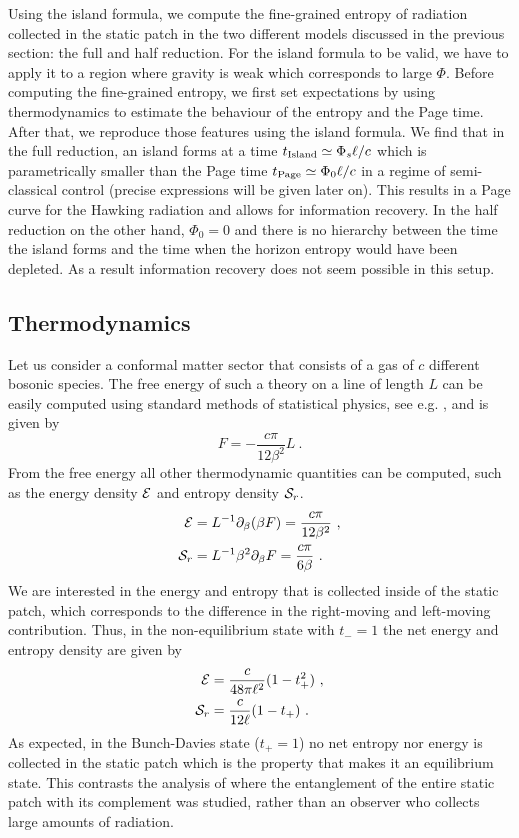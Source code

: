 \documentclass[a4paper,11pt]{article}
\newcommand{\beq}{\begin{equation}}
\newcommand{\eeq}{\end{equation}}
\newcommand{\bal}{\begin{aligned}}
\newcommand{\eal}{\end{aligned}}
\numberwithin{equation}{section}
\begin{document}
Using the island formula, we compute the fine-grained entropy of radiation collected in the static patch in the two different models discussed in the previous section: the full and half reduction. For the island formula to be valid, we have to apply it to a region where gravity is weak which corresponds to large $\Phi$. Before computing the fine-grained entropy, we first set expectations by using thermodynamics to estimate the behaviour of the entropy and the Page time. After that, we reproduce those features using the island formula. 
We find that in the full reduction, an island forms at a time $t_{\rm Island}\simeq \Phi_s\ell/c$ which is parametrically smaller than the Page time $t_{\rm Page} \simeq \Phi_0\ell/c$ in a regime of semi-classical control (precise expressions will be given later on). This results in a Page curve for the Hawking radiation and allows for information recovery. In the half reduction on the other hand, $\Phi_0=0$ and there is no hierarchy between the time the island forms and the time when the horizon entropy would have been depleted. As a result information recovery does not seem possible in this setup.

\subsection{Thermodynamics}
%
Let us consider a conformal matter sector that consists of a gas of $c$ different bosonic species. The free energy of such a theory on a line of length $L$ can be easily computed using standard methods of statistical physics, see e.g. \cite{TongLectures}, and is given by
\beq
F =  -\frac{c\pi}{12\beta^2}L ~.
\eeq
From the free energy all other thermodynamic quantities can be computed, such as the energy density ${\cal E}$ and entropy density ${\cal S}_r$.
\beq
\bal
{\cal E} &= L^{-1}\partial_\beta(\beta F)=\frac{c\pi}{12\beta^2} ~, \\
{\cal S}_r &=L^{-1}\beta^2\partial_\beta F = \frac{c\pi}{6\beta} ~.
\eal
\eeq
We are interested in the energy and entropy that is collected inside of the static patch, which corresponds to the difference in the right-moving and left-moving contribution. Thus, in the non-equilibrium state with $t_-=1$ the net energy and entropy density are given by
\beq
\bal
{\cal E} &= \frac{c}{48\pi\ell^2}(1-t_+^2) ~, \\
{\cal S}_r &= \frac{c}{12\ell}(1-t_+) ~.
\eal
\eeq
As expected, in the Bunch-Davies state ($t_+=1$) no net entropy nor energy is collected in the static patch which is the property that makes it an equilibrium state. This contrasts the analysis of \cite{Sybesma:2020fxg} where the entanglement of the entire static patch with its complement was studied, rather than an observer who collects large amounts of radiation.
\end{document}
